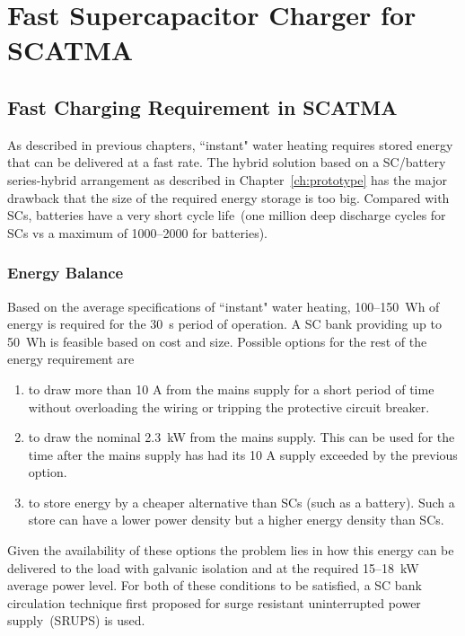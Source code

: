 \chapter{\textbf{Fast Supercapacitor Charger for SCATMA}}
\label{ch:Charger_basics}

\section{Fast Charging Requirement in SCATMA}
As described in previous chapters, ``instant" water heating requires stored energy that can be delivered at a fast rate. The hybrid solution based on a SC/battery series-hybrid arrangement as described in Chapter~\ref{ch:prototype} has the major drawback that the size of the required energy storage is too big. Compared with SCs, batteries have a very short cycle life~(one million deep discharge cycles for SCs vs a maximum of 1000--2000 for batteries\cite{Schneuwly:00}). 

\subsection{Energy Balance}
Based on the average specifications of ``instant" water heating, 100--150~Wh of energy is required for the 30~s period of operation. A SC bank providing up to 50~Wh is feasible based on cost and size. Possible options for the rest of the energy requirement are

\begin{enumerate}
	\item to draw more than 10 A from the mains supply for a short period of time without overloading the wiring or tripping the protective circuit breaker.  
	\item to draw the nominal 2.3~kW from the mains supply. This can be used for the time after the mains supply has had its 10 A supply exceeded by the previous option.
	\item to store energy by a cheaper alternative than SCs (such as a battery). Such a store can have a lower power density but a higher energy density than SCs.
\end{enumerate}



Given the availability of these options the problem lies in how this energy can be delivered to the load with galvanic isolation and at the required 15--18~kW average power level. For both of these conditions to be satisfied, a SC bank circulation technique first proposed for surge resistant uninterrupted power supply~(SRUPS)\cite{SRUPS:11, Madawala:2007} is used.

